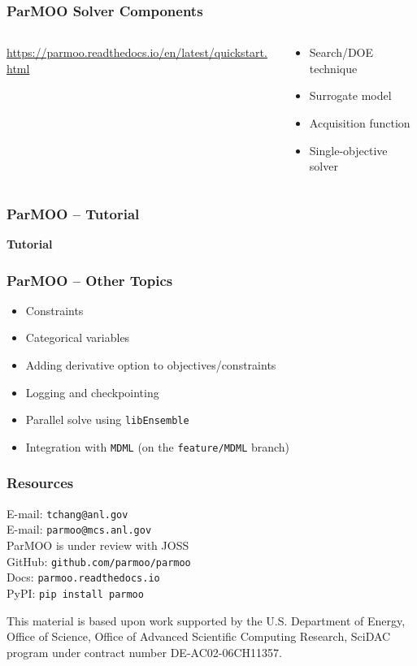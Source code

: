 \documentclass[aspectratio=169]{beamer}
\begin{document}
\begin{frame}\frametitle{ParMOO Solver Components}
\begin{columns}
\begin{column}{0.5\textwidth}

\url{https://parmoo.readthedocs.io/en/latest/quickstart.html}

\end{column}
\begin{column}{0.5\textwidth}
\begin{itemize}
\pause \item Search/DOE technique
\pause \item Surrogate model
\pause \item Acquisition function
\pause \item Single-objective solver
\end{itemize}
\end{column}
\end{columns}
\end{frame}

\begin{frame}\frametitle{ParMOO -- Tutorial}

\begin{center}
{\huge \bf Tutorial}
\end{center}

\end{frame}

\begin{frame}\frametitle{ParMOO -- Other Topics}
\begin{itemize}
\pause \item Constraints
\pause \item Categorical variables
\pause \item Adding derivative option to objectives/constraints
\pause \item Logging and checkpointing
\pause \item Parallel solve using {\tt libEnsemble}
\pause \item Integration with {\tt MDML} (on the {\tt feature/MDML} branch)
\end{itemize}
\end{frame}

\begin{frame}\frametitle{Resources}
\begin{center}
{\large
E-mail: {\tt tchang@anl.gov}\\
E-mail: {\tt parmoo@mcs.anl.gov}\\
\bigskip
\bigskip
ParMOO is under review with JOSS\\
\bigskip
\bigskip
GitHub: {\tt github.com/parmoo/parmoo}\\
Docs: {\tt parmoo.readthedocs.io}\\
PyPI: {\tt pip install parmoo}}

\bigskip
\bigskip

{\small This material is based upon work supported by the U.S. Department of Energy, Office of Science, Office of Advanced Scientific Computing Research, SciDAC program under contract number DE-AC02-06CH11357.}
\end{center}
\end{frame}
\end{document}
